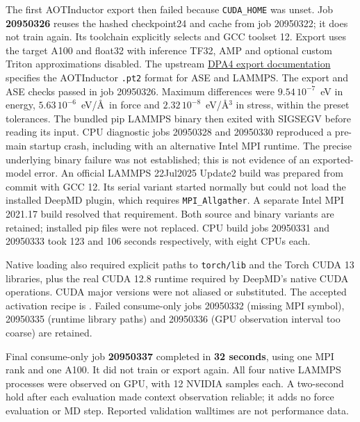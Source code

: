 \documentclass[10pt,a4paper]{article}
\begin{document}
The first AOTInductor export then failed because \texttt{CUDA\_HOME} was unset.
Job \textbf{20950326} reuses the hashed checkpoint24 and cache from job 20950322;
it does not train again. Its toolchain explicitly selects
 and GCC toolset 12. Export uses the target A100 and float32
with inference TF32, AMP and optional custom Triton approximations disabled.
The upstream
\href{https://docs.deepmodeling.com/projects/deepmd/en/stable/model/dpa4.html}{DPA4 export documentation}
specifies the AOTInductor \texttt{.pt2} format for ASE and LAMMPS.
The export and ASE checks passed in job 20950326. Maximum differences were
$9.54\,10^{-7}$~eV in energy, $5.63\,10^{-6}$~eV/\AA\ in force and
$2.32\,10^{-8}$~eV/\AA$^3$ in stress, within the preset tolerances.
The bundled pip LAMMPS binary then exited with SIGSEGV before reading its input.
CPU diagnostic jobs 20950328 and 20950330 reproduced a pre-main startup crash,
including with an alternative Intel MPI runtime. The precise underlying binary
failure was not established; this is not evidence of an exported-model error.
An official LAMMPS 22Jul2025 Update2 build was prepared from commit
 with GCC 12. Its serial variant
started normally but could not load the installed DeepMD plugin, which requires
\texttt{MPI\_Allgather}. A separate Intel MPI 2021.17 build resolved that
requirement. Both source and binary variants are retained; installed pip files
were not replaced. CPU build jobs 20950331 and 20950333 took 123 and 106 seconds
respectively, with eight CPUs each.

Native loading also required explicit paths to \texttt{torch/lib} and the
Torch CUDA 13 libraries, plus the real CUDA 12.8 runtime required by DeepMD's
native CUDA operations. CUDA major versions were not aliased or substituted.
The accepted activation recipe is .
Failed consume-only jobs 20950332 (missing MPI symbol), 20950335 (runtime library
paths) and 20950336 (GPU observation interval too coarse) are retained.

Final consume-only job \textbf{20950337} completed in \textbf{32 seconds}, using
one MPI rank and one A100. It did not train or export again. All four native
LAMMPS processes were observed on GPU, with 12 NVIDIA samples each. A two-second
hold after each evaluation made context observation reliable; it adds no force
evaluation or MD step. Reported validation walltimes are not performance data.
\end{document}
